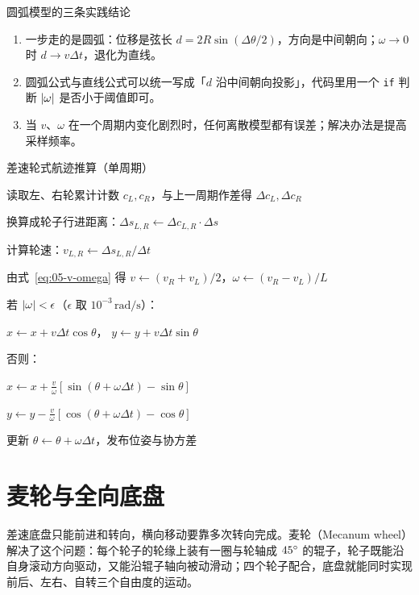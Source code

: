 \begin{keybox}{圆弧模型的三条实践结论}
\begin{enumerate}
  \item 一步走的是圆弧：位移是弦长 $d=2R\sin(\Delta\theta/2)$，方向是中间朝向；$\omega\to0$ 时 $d\to v\Delta t$，退化为直线。
  \item 圆弧公式与直线公式可以统一写成「$d$ 沿中间朝向投影」，代码里用一个 \texttt{if} 判断 $\left\lvert \omega \right\rvert$ 是否小于阈值即可。
  \item 当 $v$、$\omega$ 在一个周期内变化剧烈时，任何离散模型都有误差；解决办法是提高采样频率。
\end{enumerate}
\end{keybox}

\begin{pseudo}{差速轮式航迹推算（单周期）}
  \item 读取左、右轮累计计数 $c_L,c_R$，与上一周期作差得 $\Delta c_L,\Delta c_R$
  \item 换算成轮子行进距离：$\Delta s_{L,R}\leftarrow\Delta c_{L,R}\cdot\Delta s$
  \item 计算轮速：$v_{L,R}\leftarrow\Delta s_{L,R}/\Delta t$
  \item 由式~\eqref{eq:05-v-omega} 得 $v\leftarrow(v_R+v_L)/2$，$\omega\leftarrow(v_R-v_L)/L$
  \item 若 $\left\lvert \omega \right\rvert<\epsilon$（$\epsilon$ 取 $10^{-3}\,\mathrm{rad/s}$）：
  \item \quad $x\leftarrow x+v\Delta t\cos\theta$， $y\leftarrow y+v\Delta t\sin\theta$
  \item 否则：
  \item \quad $x\leftarrow x+\frac{v}{\omega}[\sin(\theta+\omega\Delta t)-\sin\theta]$
  \item \quad $y\leftarrow y-\frac{v}{\omega}[\cos(\theta+\omega\Delta t)-\cos\theta]$
  \item 更新 $\theta\leftarrow\theta+\omega\Delta t$，发布位姿与协方差
\end{pseudo}

\section{麦轮与全向底盘}\label{sec:05-mecanum}

差速底盘只能前进和转向，横向移动要靠多次转向完成。麦轮（Mecanum wheel）解决了这个问题：每个轮子的轮缘上装有一圈与轮轴成 $45^\circ$ 的辊子，轮子既能沿自身滚动方向驱动，又能沿辊子轴向被动滑动；四个轮子配合，底盘就能同时实现前后、左右、自转三个自由度的运动。

